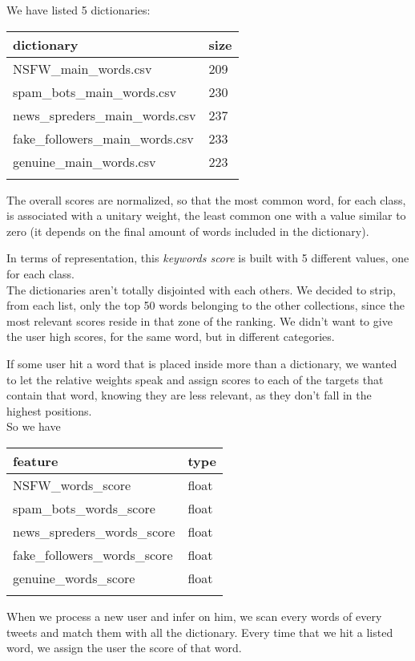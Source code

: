 We have listed 5 dictionaries: 
\small
\begin{center}
	\begin{tabular}{ll}
		\\dictionary&size\\
		\hline\hline
		NSFW\_main\_words.csv&209\\
		spam\_bots\_main\_words.csv&230\\
		news\_spreders\_main\_words.csv&237\\
		fake\_followers\_main\_words.csv&233\\
		genuine\_main\_words.csv&223\\\hline\\
	\end{tabular}
\end{center}
\normalsize

The overall scores are normalized, so that the most common word, for each class, is associated with a unitary weight, the least common one with a value similar to zero (it depends on the final amount of words included in the dictionary).

In terms of representation, this \textit{keywords score} is built with 5 different values, one for each class.\\
The dictionaries aren't totally disjointed with each others.
We decided to strip, from each list, only the top 50 words belonging to the other collections, since the most relevant scores reside in that zone of the ranking. We didn't want to give the user high scores, for the same word, but in different categories.

If some user hit a word that is placed inside more than a dictionary, we wanted to let the relative weights speak and assign scores to each of the targets that contain that word, knowing they are less relevant, as they don't fall in the highest positions.\\
So we have

\small
\begin{center}
	\begin{tabular}{ll}
		\\feature&type\\
		\hline\hline
		NSFW\_words\_score&float\\
		spam\_bots\_words\_score&float\\
		news\_spreders\_words\_score&float\\
		fake\_followers\_words\_score&float\\
		genuine\_words\_score&float\\\hline\\
	\end{tabular}
\end{center}
\normalsize
When we process a new user and infer on him, we scan every words of every tweets and match them with all the dictionary. Every time that we hit a listed word, we assign the user the score of that word.

